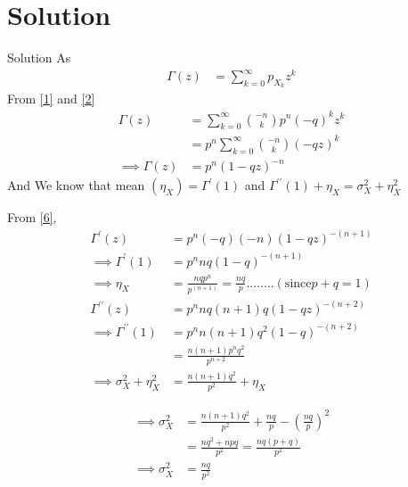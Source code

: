 \documentclass{beamer}
\begin{document}
\section{Solution}
\begin{frame}{Solution}
    As 
    \begin{align}
        \Gamma(z)&=\sum_{k=0}^\infty p_{X_k}z^k
    \end{align}
From \eqref{1} and \eqref{2}
\begin{align}
    \Gamma(z)&=\sum_{k=0}^\infty \binom{-n}{k}p^n (-q)^{k}z^k\\
    &=p^n \sum_{k=0}^\infty \binom{-n}{k} (-qz)^k\\
    \implies \Gamma(z)&=p^n (1-qz)^{-n}
    \label{6}
\end{align}
And We know that mean $(\eta_X) =\Gamma^\prime(1)$
and $\Gamma^{\prime\prime}(1) +\eta_X = \sigma_X ^2 + \eta_X ^2$
\end{frame}
\begin{frame}{}
From \eqref{6},
\begin{align}
    \Gamma^\prime(z) &= p^n(-q)(-n)(1-qz)^{-(n+1)}\\
    \implies \Gamma^\prime(1) &= p^n nq (1-q)^{-(n+1)}\\
    \implies \eta_X&=\frac{nqp^n}{p^{(n+1)}}=\frac{nq}{p}........(\text{since} p+q=1)\\
    \Gamma^{\prime\prime}(z)&= p^n nq(n+1)q(1-qz)^{-(n+2)}\\
    \implies \Gamma^{\prime\prime}(1)&= p^n n(n+1)q^2(1-q)^{-(n+2)}\\
    &=\frac{n(n+1)p^nq^2}{p^{n+2}}\\
    \implies  \sigma_X ^2 + \eta_X ^2 &=\frac{n(n+1)q^2}{p^{2}} +\eta_X
\end{align}    
\end{frame}
\begin{frame}{}
    \begin{align}
        \implies  \sigma_X ^2 &=\frac{n(n+1)q^2}{p^{2}} +\frac{nq}{p}- \left(\frac{nq}{p}\right)^2\\
        &=\frac{nq^2+npq}{p^2}=\frac{nq(p+q)}{p^2}\\
        \implies \sigma_X^2 &=\frac{nq}{p^2}
    \end{align}
\end{frame}
 
\end{document}
